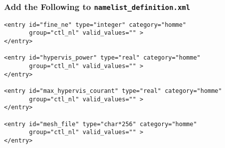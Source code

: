 \documentclass{beamer}
\begin{document}
%
\hypertarget{namelist}{}
\begin{frame}[containsverbatim]
\frametitle{Add the Following to \texttt{namelist\_definition.xml}}
\begin{block}{}
\begin{verbatim}
<entry id="fine_ne" type="integer" category="homme"
       group="ctl_nl" valid_values="" >
</entry>

<entry id="hypervis_power" type="real" category="homme"
       group="ctl_nl" valid_values="" >
</entry>

<entry id="max_hypervis_courant" type="real" category="homme"
       group="ctl_nl" valid_values="" >
</entry>

<entry id="mesh_file" type="char*256" category="homme"
       group="ctl_nl" valid_values="" >
</entry>
\end{verbatim}
\end{block}
\end{frame}
%
\end{document}

